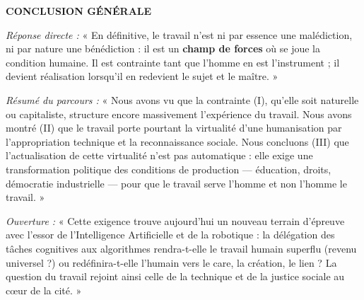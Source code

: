 \documentclass[11pt]{article}
\newcommand{\cle}[1]{{\popxbold\color{popdark}#1}}
\begin{document}
\begin{exoresolu}
\textbf{CONCLUSION GÉNÉRALE}

\textit{Réponse directe :} « En définitive, le travail n'est ni par essence une malédiction, ni par nature une bénédiction : il est un \textbf{champ de forces} où se joue la condition humaine. Il est contrainte tant que l'homme en est l'instrument ; il devient réalisation lorsqu'il en redevient le sujet et le maître. »

\textit{Résumé du parcours :} « Nous avons vu que la contrainte (I), qu'elle soit naturelle ou capitaliste, structure encore massivement l'expérience du travail. Nous avons montré (II) que le travail porte pourtant la virtualité d'une humanisation par l'appropriation technique et la reconnaissance sociale. Nous concluons (III) que l'actualisation de cette virtualité n'est pas automatique : elle exige une \cle{transformation politique} des conditions de production — éducation, droits, démocratie industrielle — pour que le travail serve l'homme et non l'homme le travail. »

\textit{Ouverture :} « Cette exigence trouve aujourd'hui un nouveau terrain d'épreuve avec l'essor de l'\cle{Intelligence Artificielle} et de la robotique : la délégation des tâches cognitives aux algorithmes rendra-t-elle le travail humain superflu (revenu universel ?) ou redéfinira-t-elle l'humain vers le care, la création, le lien ? La question du travail rejoint ainsi celle de la \cle{technique} et de la \cle{justice sociale} au cœur de la cité. »
\end{exoresolu}
\end{document}
